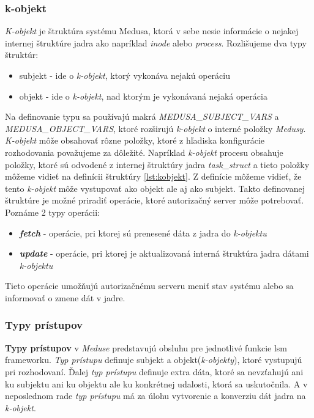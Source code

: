 \subsubsection{k-objekt}
\textit{K-objekt} je štruktúra systému Medusa, ktorá v sebe nesie informácie o nejakej internej štruktúre jadra ako napríklad \textit{inode} alebo \textit{process}. Rozlišujeme dva typy štruktúr:
\begin{itemize}
\item subjekt - ide o \textit{k-objekt}, ktorý vykonáva nejakú operáciu
\item objekt - ide o \textit{k-objekt}, nad ktorým je vykonávaná nejaká operácia
\end{itemize}
Na definovanie typu sa používajú makrá \textit{MEDUSA\_SUBJECT\_VARS} a \textit{MEDUSA\_OBJECT\_VARS}, ktoré rozširujú \textit{k-objekt} o interné položky \textit{Medusy}.\cite{kacer}
\textit{K-objekt} môže obsahovať rôzne položky, ktoré z hľadiska konfigurácie rozhodovania považujeme za dôležité. Napríklad \textit{k-objekt} procesu obsahuje položky, ktoré sú odvodené z internej štruktúry jadra \textit{task\_struct} a tieto položky môžeme vidieť na definícii štruktúry \ref{lst:kobjekt}. Z definície môžeme vidieť, že tento \textit{k-objekt} môže vystupovať ako objekt ale aj ako subjekt. Takto definovanej štruktúre je možné priradiť operácie, ktoré autorizačný server môže potrebovať. Poznáme 2 typy operácii:
\begin{itemize}
\item \textbf{\textit{fetch}} - operácie, pri ktorej sú prenesené dáta z jadra do \textit{k-objektu}
\item \textbf{\textit{update}} - operácie, pri ktorej je aktualizovaná interná štruktúra jadra dátami \textit{k-objektu}
\end{itemize}
Tieto operácie umožňujú autorizačnému serveru meniť stav systému alebo sa informovať o zmene dát v jadre.
\subsubsection{Typy prístupov}
\textbf{Typy prístupov} v \textit{Meduse} predstavujú obsluhu pre jednotlivé funkcie \acrshort{lsm} frameworku. \textit{Typ prístupu} definuje subjekt a objekt(\textit{k-objekty}), ktoré vystupujú pri rozhodovaní. Ďalej \textit{typ prístupu} definuje extra dáta, ktoré sa nevzťahujú ani ku subjektu ani ku objektu ale ku konkrétnej udalosti, ktorá sa uskutočnila. A v neposlednom rade \textit{typ prístupu} má za úlohu vytvorenie a konverziu dát jadra na \textit{k-objekt}. 

